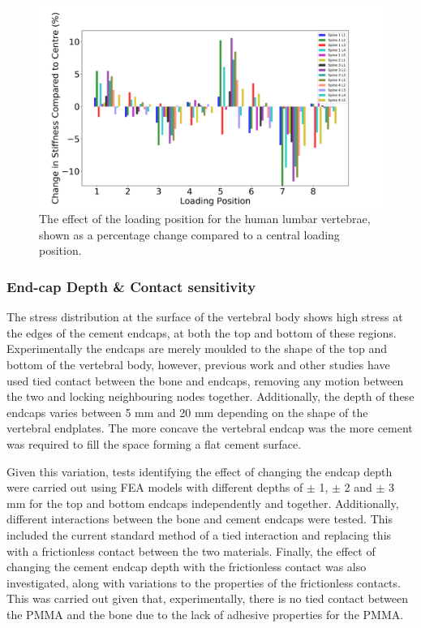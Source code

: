 \begin{figure}[ht!]
\centering
\includegraphics[width=\textwidth]{Chapters/Chapter_HT_images/human_fossil_loading.png}
\caption{The effect of the loading position for the human lumbar vertebrae, shown as a percentage change compared to a central loading position.}
\label{fig:hum_load}
\end{figure}



\subsubsection{End-cap Depth \& Contact sensitivity}

The stress distribution at the surface of the vertebral body shows high stress at the edges of the cement endcaps, at both the top and bottom of these regions.
Experimentally the endcaps are merely moulded to the shape of the top and bottom of the vertebral body, however, previous work and other studies have used tied contact between the bone and endcaps, removing any motion between the two and locking neighbouring nodes together.
Additionally, the depth of these endcaps varies between 5 mm and 20 mm depending on the shape of the vertebral endplates.
The more concave the vertebral endcap was the more cement was required to fill the space forming a flat cement surface.

Given this variation, tests identifying the effect of changing the endcap depth were carried out using FEA models with different depths of $\pm$ 1, $\pm$ 2 and $\pm$ 3 mm for the top and bottom endcaps independently and together.
Additionally, different interactions between the bone and cement endcaps were tested.
This included the current standard method of a tied interaction and replacing this with a frictionless contact between the two materials.
Finally, the effect of changing the cement endcap depth with the frictionless contact was also investigated, along with variations to the properties of the frictionless contacts.
This was carried out given that, experimentally, there is no tied contact between the PMMA and the bone due to the lack of adhesive properties for the PMMA.

